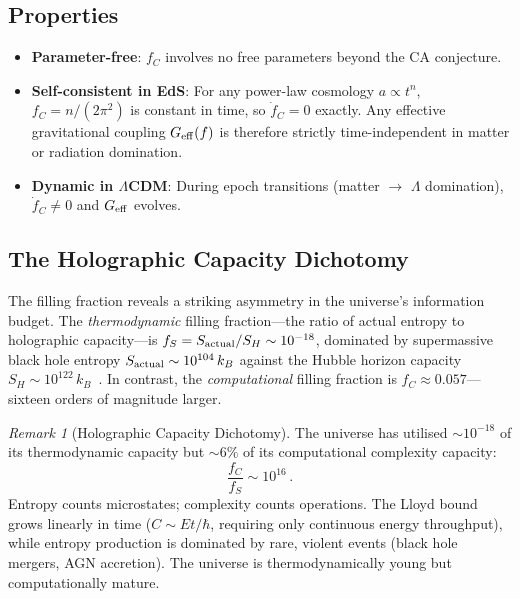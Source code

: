 \documentclass[12pt,a4paper]{article}
\theoremstyle{remark}
\newtheorem{remark}{Remark}
\begin{document}
\subsection{Properties}

\begin{itemize}[nosep]
\item \textbf{Parameter-free}: $f_C$ involves no free parameters beyond the CA conjecture.
\item \textbf{Self-consistent in EdS}: For any power-law cosmology $a\propto t^n$, $f_C = n/(2\pi^2)$ is constant in time, so $\dot f_C = 0$ exactly.
Any effective gravitational coupling $G_{\rm eff}(f)$ is therefore strictly time-independent in matter or radiation domination.
\item \textbf{Dynamic in $\Lambda$CDM}: During epoch transitions (matter $\to$ $\Lambda$ domination), $\dot f_C \neq 0$ and $G_{\rm eff}$ evolves.
\end{itemize}

\subsection{The Holographic Capacity Dichotomy}

The filling fraction reveals a striking asymmetry in the universe's information budget.
The \emph{thermodynamic} filling fraction---the ratio of actual entropy to holographic capacity---is $f_S = S_{\rm actual}/S_H \sim 10^{-18}$, dominated by supermassive black hole entropy $S_{\rm actual}\sim 10^{104}\,k_B$ against the Hubble horizon capacity $S_H \sim 10^{122}\,k_B$~\cite{EganLineweaver2010}.
In contrast, the \emph{computational} filling fraction is $f_C \approx 0.057$---sixteen orders of magnitude larger.

\begin{remark}[Holographic Capacity Dichotomy]
The universe has utilised $\sim 10^{-18}$ of its thermodynamic capacity but $\sim 6\%$ of its computational complexity capacity:
\begin{equation}
\frac{f_C}{f_S} \sim 10^{16}\,.
\end{equation}
Entropy counts microstates; complexity counts operations.
The Lloyd bound grows linearly in time ($C \sim Et/\hbar$, requiring only continuous energy throughput), while entropy production is dominated by rare, violent events (black hole mergers, AGN accretion).
The universe is thermodynamically young but computationally mature.
\end{remark}
\end{document}
